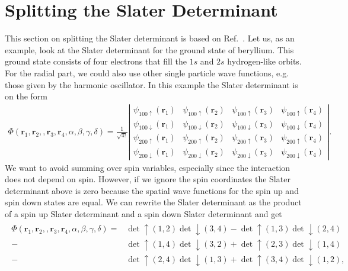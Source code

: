 \documentclass[../main.tex]{subfiles}
\begin{document}
\section{Splitting the Slater Determinant}
This section on splitting the Slater determinant is based on Ref.~\cite{FYS4411-LectureNotes}. Let us, as an example, look at the Slater determinant for the ground state of beryllium. This ground state consists of four electrons that fill the $1s$ and $2s$ hydrogen-like orbits. For the radial part, we could also use other single particle wave functions, e.g. those given by the harmonic oscillator. In this example the Slater determinant is on the form 
\begin{align}
    \Phi(\mathbf{r}_1,\mathbf{r}_2,,\mathbf{r}_3,\mathbf{r}_4, \alpha,\beta,\gamma,\delta)=\frac{1}{\sqrt{4!}}
\left| \begin{array}{cccc} \psi_{100\uparrow}(\mathbf{r}_1)& \psi_{100\uparrow}(\mathbf{r}_2)& \psi_{100\uparrow}(\mathbf{r}_3)&\psi_{100\uparrow}(\mathbf{r}_4) \\
\psi_{100\downarrow}(\mathbf{r}_1)& \psi_{100\downarrow}(\mathbf{r}_2)& \psi_{100\downarrow}(\mathbf{r}_3)&\psi_{100\downarrow}(\mathbf{r}_4) \\
\psi_{200\uparrow}(\mathbf{r}_1)& \psi_{200\uparrow}(\mathbf{r}_2)& \psi_{200\uparrow}(\mathbf{r}_3)&\psi_{200\uparrow}(\mathbf{r}_4) \\
\psi_{200\downarrow}(\mathbf{r}_1)& \psi_{200\downarrow}(\mathbf{r}_2)& \psi_{200\downarrow}(\mathbf{r}_3)&\psi_{200\downarrow}(\mathbf{r}_4) \end{array} \right|. 
\end{align}
We want to avoid summing over spin variables, especially since the interaction does not depend on spin. However, if we ignore the spin coordinates the Slater determinant above is zero because the spatial wave functions for the spin up and spin down states are equal. We can rewrite the Slater determinant as the product of a spin up Slater determinant and a spin down Slater determinant and get 
\begin{align}
\begin{split}
    \Phi(\mathbf{r}_1,\mathbf{r}_2,,\mathbf{r}_3,\mathbf{r}_4, \alpha,\beta,\gamma,\delta)=&\det\uparrow(1,2)\det\downarrow(3,4)-\det\uparrow(1,3)\det\downarrow(2,4)\\
    -&\det\uparrow(1,4)\det\downarrow(3,2)+\det\uparrow(2,3)\det\downarrow(1,4)\\
    -&\det\uparrow(2,4)\det\downarrow(1,3)+\det\uparrow(3,4)\det\downarrow(1,2),
\end{split}
\end{align}
\end{document}
